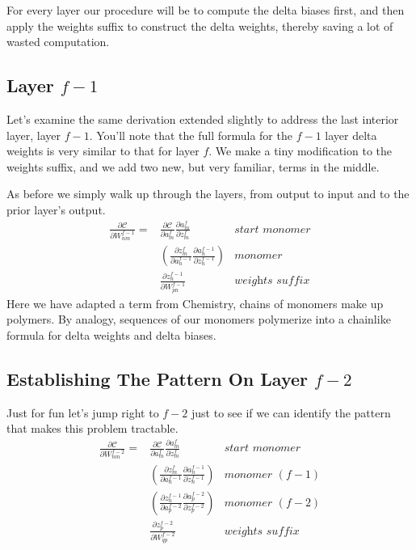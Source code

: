 \documentclass[twocolumn]{revtex4-1}
\newcommand{\cC}{\mathscr{C}}
\newcommand{\parpar}[2]{\frac{\partial #1}{\partial #2}}
\begin{document}
For every layer our procedure will be to compute the delta biases first, and then apply the weights suffix to construct the delta weights, thereby saving a lot of wasted computation.

\subsection{Layer $f-1$}
Let's examine the same derivation extended slightly to address the last interior layer, layer $f-1$. You'll note that the full formula for the $f-1$ layer delta weights is very similar to that for layer $f$. We make a tiny modification to the weights suffix, and we add two new, but very familiar, terms in the middle.

As before we simply walk up through the layers, from output to input and to the prior layer's output.
\begin{align}
    \parpar{\cC}{W^{f-1}_{n m}} = & \parpar{\cC}{a^f_m} \parpar{a^f_m}{z^f_m} & \textit{start monomer}\nonumber \\
    & \left(\parpar{z^f_m}{a^{f-1}_n} \parpar{a^{f-1}_n}{z^{f-1}_n} \right) & \textit{monomer}\nonumber \\
    & \parpar{z^{f-1}_n}{W^{f-1}_{p n}} & \textit{weights suffix}
\end{align}
Here we have adapted a term from Chemistry, chains of monomers make up polymers. By analogy, sequences of our monomers polymerize into a chainlike formula for delta weights and delta biases.

\subsection{Establishing The Pattern On Layer $f-2$}
Just for fun let's jump right to $f-2$ just to see if we can identify the pattern that makes this problem tractable.
\begin{align}
    \parpar{\cC}{W^{f-2}_{n m}} = & \parpar{\cC}{a^f_m} \parpar{a^f_m}{z^f_m} & \textit{start monomer} \nonumber \\
        & \left(\parpar{z^f_m}{a^{f-1}_n} \parpar{a^{f-1}_n}{z^{f-1}_n} \right) & \textit{monomer $(f-1)$} \nonumber \\
        & \left(\parpar{z^{f-1}_n}{a^{f-2}_p} \parpar{a^{f-2}_p}{z^{f-2}_p} \right) & \textit{monomer $(f-2)$} \nonumber \\
        & \parpar{z^{f-2}_p}{W^{f-2}_{q p}} & \textit{weights suffix}
\end{align}
\end{document}
